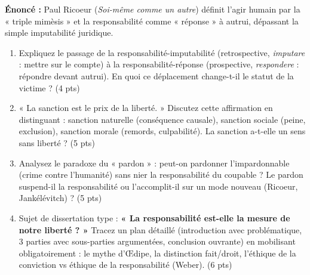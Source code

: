 \documentclass[11pt]{article}
\begin{document}
\begin{exercice}
\textbf{Énoncé :} Paul Ricoeur (\textit{Soi-même comme un autre}) définit l'agir humain par la « triple mimèsis » et la responsabilité comme « réponse » à autrui, dépassant la simple imputabilité juridique.
\begin{enumerate}
    \item Expliquez le passage de la responsabilité-imputabilité (retrospective, \textit{imputare} : mettre sur le compte) à la responsabilité-réponse (prospective, \textit{respondere} : répondre devant autrui). En quoi ce déplacement change-t-il le statut de la victime ? (4 pts)
    \item « La sanction est le prix de la liberté. » Discutez cette affirmation en distinguant : sanction naturelle (conséquence causale), sanction sociale (peine, exclusion), sanction morale (remords, culpabilité). La sanction a-t-elle un sens sans liberté ? (5 pts)
    \item Analysez le paradoxe du « pardon » : peut-on pardonner l'impardonnable (crime contre l'humanité) sans nier la responsabilité du coupable ? Le pardon suspend-il la responsabilité ou l'accomplit-il sur un mode nouveau (Ricoeur, Jankélévitch) ? (5 pts)
    \item Sujet de dissertation type : \textbf{« La responsabilité est-elle la mesure de notre liberté ? »} Tracez un plan détaillé (introduction avec problématique, 3 parties avec sous-parties argumentées, conclusion ouvrante) en mobilisant obligatoirement : le mythe d'Œdipe, la distinction fait/droit, l'éthique de la conviction vs éthique de la responsabilité (Weber). (6 pts)
\end{enumerate}
\end{exercice}
\end{document}
